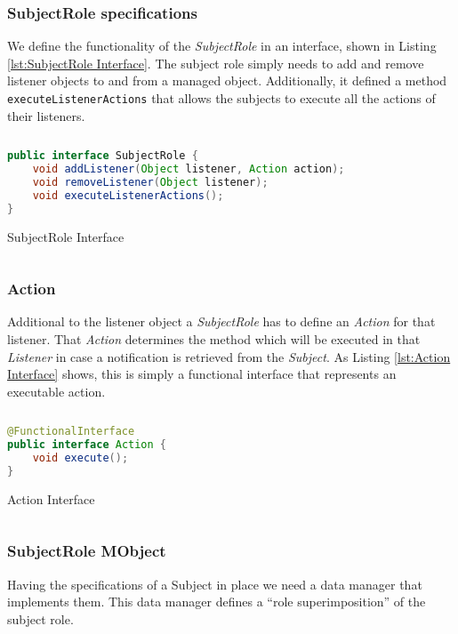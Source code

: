 \subsubsection{SubjectRole specifications}
We define the functionality of the \textit{SubjectRole} in an interface, shown in Listing \ref{lst:SubjectRole Interface}.
The subject role simply needs to add and remove listener objects to and from a managed object.
Additionally, it defined a method \texttt{executeListenerActions} that allows the subjects to execute all the actions of their listeners.

\begin{sourcecode} [H]
	\begin{lstlisting}[language=Java, escapechar=|]
public interface SubjectRole {
	void addListener(Object listener, Action action);
	void removeListener(Object listener);
	void executeListenerActions();
}
	\end{lstlisting}
	\caption{SubjectRole Interface}
	\label{lst:SubjectRole Interface}
\end{sourcecode}

\subsubsection{Action}
Additional to the listener object a \textit{SubjectRole} has to define an \textit{Action} for that listener.
That \textit{Action} determines the method which will be executed in that \textit{Listener} in case a notification is retrieved from the \textit{Subject}.
As Listing \ref{lst:Action Interface} shows, this is simply a functional interface that represents an executable action.

\begin{sourcecode} [H]
	\begin{lstlisting}[language=Java, escapechar=|]
@FunctionalInterface
public interface Action {
	void execute();
}
	\end{lstlisting}
	\caption{Action Interface}
	\label{lst:Action Interface}
\end{sourcecode}

\subsubsection{SubjectRole MObject}
Having the specifications of a Subject in place we need a data manager that implements them.
This data manager defines a ``role superimposition'' of the subject role.

